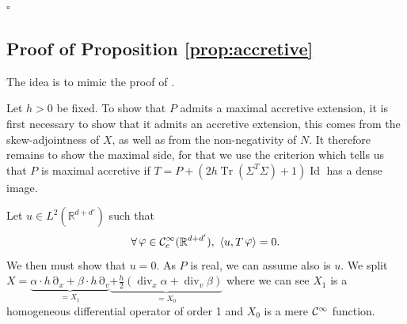 \documentclass[12pt]{amsart}
\newcommand{\Id}{\operatorname{Id}}
\newcommand{\R}{\mathbb R}
\newcommand{\Tr}{{\operatorname{Tr}}}
\renewcommand{\div}{\operatorname{div}}
\def\<{\langle}
\def\>{\rangle}
\newcommand{\ep}{\hfill $\square$}
\numberwithin{equation}{section}
\numberwithin{figure}{section}
\DeclareMathOperator{\p}{\partial}
\DeclareMathOperator{\phii}{\varphi}
\begin{document}
\ep










\subsection{Proof of Proposition \ref{prop:accretive}}\label{ssec:accretive}

The idea is to mimic the proof of \cite[Theorem 15.1]{He13}.

Let $h>0$ be fixed. To show that $P$ admits a maximal accretive extension, it is first necessary to show that it admits an accretive extension, this comes from the skew-adjointness of $X$, as well as from the non-negativity of $N$. It therefore remains to show the maximal side, for that we use the criterion which tells us that $P$ is maximal accretive if $T=P+(2h\Tr(\Sigma^T\Sigma)+1)\Id$ has a dense image.

Let $u\in L^2(\R^{d+d'})$ such that
\begin{equation}\label{eq:uTphii}
\forall \phii\in\ccc_c^\infty(\R^{d+d'}),\ \< u,T\phii\> =0.
\end{equation}
We then must show that $u=0$. As $P$ is real, we can assume also is $u$. We split $X= \underbrace{\alpha\cdot h\p_x + \beta\cdot h\p_v}_{=X_1}\underbrace{+\frac h2(\div_x\alpha+\div_v\beta)}_{=X_0}$ where we can see $X_1$ is a homogeneous differential operator of order 1 and $X_0$ is a mere ${\mathcal C}^\infty$ function.
\end{document}
